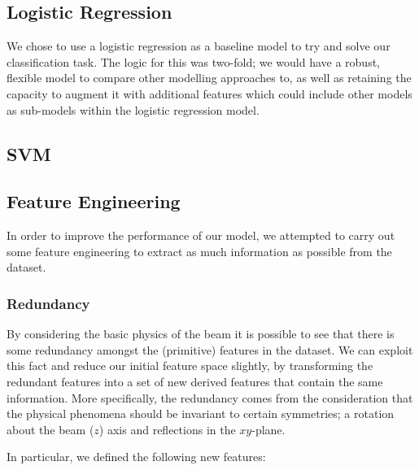 \subsection{Logistic Regression}
We chose to use a logistic regression as a baseline model to try and solve our classification task. The logic for this was two-fold; we would have a robust, flexible model to compare other modelling approaches to, as well as retaining the capacity to augment it with additional features which could include other models as sub-models within the logistic regression model. 

\subsection{SVM}

\subsection{Feature Engineering}
In order to improve the performance of our model, we attempted to carry out some feature engineering to extract as much information as possible from the dataset.

\subsubsection{Redundancy}
By considering the basic physics of the beam it is possible to see that there is some redundancy amongst the (primitive) features in the dataset. We can exploit this fact and reduce our initial feature space slightly, by transforming the redundant features into a set of new derived features that contain the same information. 
More specifically, the redundancy comes from the consideration that the physical phenomena should be invariant to certain symmetries; a rotation about the beam ($z$) axis and reflections in the $xy$-plane.

In particular, we defined the following new features:

